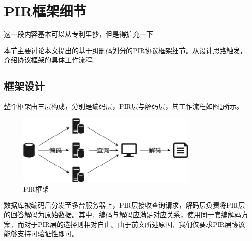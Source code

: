 \section{PIR框架细节}
\label{sec:pir-framework}
{这一段内容基本可以从专利里抄，但是得扩充一下}

本节主要讨论本文提出的基于纠删码划分的PIR协议框架细节。从设计思路触发，介绍协议框架的具体工作流程。

\subsection{框架设计}
整个框架由三层构成，分别是编码层，PIR层与解码层，其工作流程如图\ref{fig:pir-framework}所示。

\begin{figure}
    \centering
    \includegraphics[width=0.8\textwidth]{figure/PIR-framework.png}
    \caption{PIR框架}
    \label{fig:pir-framework}
\end{figure}

数据库被编码后分发至多台服务器上，PIR层接收查询请求，解码层负责将PIR层的回答解码为原始数据。其中，编码与解码应满足对应关系，使用同一套编解码方案，而对于PIR层的选择则相对自由。由于前文所述原因，我们仅要求PIR层协议能够支持可验证性即可。

